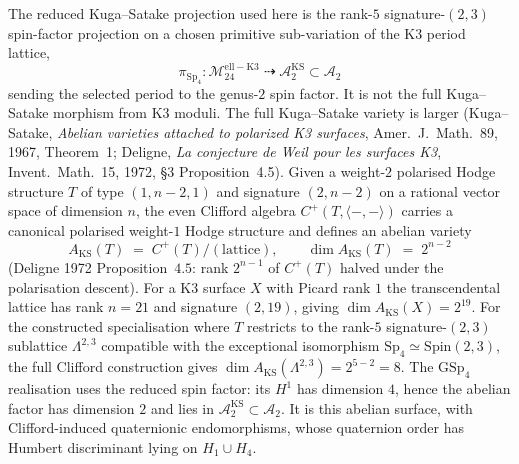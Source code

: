 \begin{proposition}
\label{prop:kuga-satake-step}
The reduced Kuga--Satake projection used here is the rank-$5$
signature-$(2,3)$ spin-factor projection on a chosen primitive
sub-variation of the K3 period lattice,
\[
 \pi_{\mathrm{Sp}_4}\colon
 \mathcal{M}^{\mathrm{ell-K3}}_{24}
 \;\dashrightarrow\;
 \mathcal{A}_2^{\mathrm{KS}}\subset\mathcal{A}_2
\]
sending the selected period to the genus-$2$ spin factor. It is not the full Kuga--Satake morphism from K3 moduli. The full Kuga--Satake variety is larger (Kuga--Satake, \emph{Abelian varieties attached to polarized K3 surfaces}, Amer.\ J.\ Math.~89, 1967, Theorem~1; Deligne, \emph{La conjecture de Weil pour les surfaces K3}, Invent.~Math.~15, 1972, \S 3 Proposition~4.5). Given a weight-$2$ polarised Hodge structure $T$ of type $(1, n-2, 1)$ and signature $(2, n-2)$ on a rational vector space of dimension $n$, the even Clifford algebra $C^+(T, \langle-, -\rangle)$ carries a canonical polarised weight-$1$ Hodge structure and defines an abelian variety
\[
 A_{\mathrm{KS}}(T)\;=\;C^+(T)/(\mathrm{lattice}), \qquad \dim A_{\mathrm{KS}}(T) \;=\; 2^{n-2}
\]
(Deligne 1972 Proposition~$4.5$: rank $2^{n-1}$ of $C^+(T)$ halved under the polarisation descent). For a K3 surface $X$ with Picard rank $1$ the transcendental lattice has rank $n = 21$ and signature $(2, 19)$, giving $\dim A_{\mathrm{KS}}(X) = 2^{19}$. For the constructed specialisation where $T$ restricts to the rank-$5$ signature-$(2, 3)$ sublattice $\Lambda^{2, 3}$ compatible with the exceptional isomorphism $\mathrm{Sp}_4 \simeq \mathrm{Spin}(2, 3)$, the full Clifford construction gives $\dim A_{\mathrm{KS}}(\Lambda^{2, 3}) = 2^{5-2} = 8$. The $\mathrm{GSp}_4$ realisation uses the reduced spin factor: its $H^1$ has dimension $4$, hence the abelian factor has dimension $2$ and lies in $\mathcal{A}_2^{\mathrm{KS}}\subset\mathcal{A}_2$. It is this abelian surface, with Clifford-induced quaternionic endomorphisms, whose quaternion order has Humbert discriminant lying on $H_1\cup H_4$.
\end{proposition}

